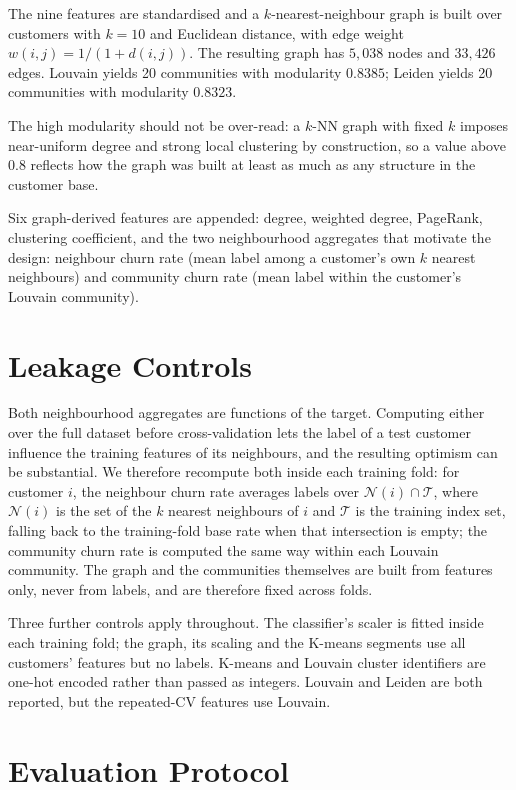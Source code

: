 \documentclass[runningheads]{llncs}
\begin{document}
The nine features are standardised and a $k$-nearest-neighbour graph is built
over customers with $k = 10$ and Euclidean distance, with edge weight
$w(i,j) = 1/(1 + d(i,j))$. The resulting graph has $5{,}038$ nodes and $33{,}426$
edges. Louvain \cite{blondel2008louvain} yields 20 communities with modularity
$0.8385$; Leiden \cite{traag2019leiden} yields 20 communities with modularity
$0.8323$.

The high modularity should not be over-read: a $k$-NN graph with fixed $k$ imposes
near-uniform degree and strong local clustering by construction, so a value above
$0.8$ reflects how the graph was built at least as much as any structure in the
customer base.

Six graph-derived features are appended: degree, weighted degree, PageRank,
clustering coefficient, and the two neighbourhood aggregates that motivate the
design: neighbour churn rate (mean label among a customer's own $k$ nearest
neighbours) and community churn rate (mean label within the customer's Louvain
community).

\section{Leakage Controls}

Both neighbourhood aggregates are functions of the target. Computing either over
the full dataset before cross-validation lets the label of a test customer
influence the training features of its neighbours, and the resulting optimism can
be substantial. We therefore recompute both inside each training fold: for
customer $i$, the neighbour churn rate averages labels over
$\mathcal{N}(i) \cap \mathcal{T}$, where $\mathcal{N}(i)$ is the set of the $k$
nearest neighbours of $i$ and $\mathcal{T}$ is the training index set,
falling back to the training-fold base rate when that intersection is empty; the
community churn rate is computed the same way within each Louvain community. The
graph and the communities themselves are built from features only, never from
labels, and are therefore fixed across folds.

Three further controls apply throughout. The classifier's scaler is fitted inside
each training fold; the graph, its scaling and the K-means segments use all
customers' features but no labels. K-means and Louvain cluster identifiers are
one-hot encoded rather than passed as integers. Louvain and Leiden are both
reported, but the repeated-CV features use Louvain.

\section{Evaluation Protocol}
\end{document}
